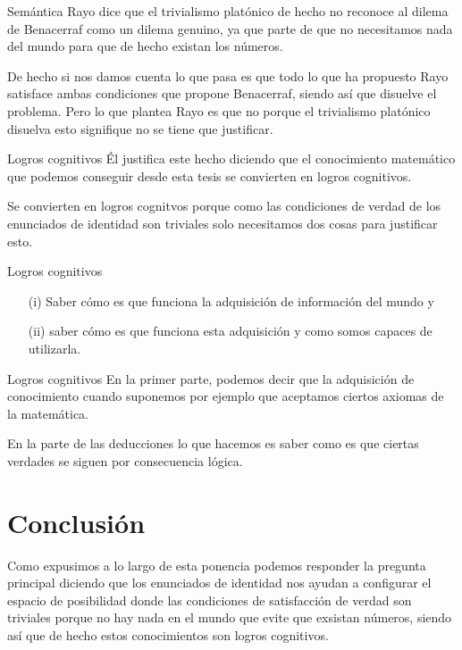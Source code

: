 \documentclass{beamer}
\begin{document}
      \begin{frame}{Semántica}
        Rayo dice que el trivialismo plat\'onico de hecho no 
        reconoce al dilema de Benacerraf como un dilema genuino, ya 
        que parte de que no necesitamos nada del mundo para que de hecho 
        existan los números. 
        
        De hecho si nos damos cuenta lo que pasa 
        es que todo lo que ha propuesto Rayo satisface ambas condiciones 
        que propone Benacerraf, siendo así que disuelve el problema. 
        Pero lo que plantea Rayo es que no porque el trivialismo 
        platónico disuelva esto signifique no se tiene que justificar.
      \end{frame}
    \begin{frame}{Logros cognitivos}
      Él justifica este hecho diciendo que el conocimiento matemático 
      que podemos conseguir desde esta tesis se convierten en logros 
      cognitivos.

      Se convierten en logros cognitvos porque como 
      las condiciones de verdad de los enunciados de identidad son 
      triviales solo necesitamos dos cosas para justificar esto.
      \begin{block}{Logros cognitivos}
        \begin{itemize}
          \item [(i)] Saber c\'omo es que funciona la adquisición de información 
          del mundo y
          \item [(ii)] saber c\'omo es que funciona esta adquisición 
          y como somos capaces de utilizarla.
        \end{itemize}
      \end{block}
    \end{frame}
    \begin{frame}{Logros cognitivos}
      En la primer parte, podemos decir que la adquisición de conocimiento
      cuando suponemos por ejemplo que aceptamos ciertos 
      axiomas de la matemática.

      En la parte de las deducciones lo que hacemos es saber 
      como es que ciertas verdades se siguen por consecuencia 
      lógica.
    \end{frame}
  \section{Conclusión}
    \begin{frame}
      Como expusimos a lo largo de esta ponencia podemos responder la 
      pregunta principal diciendo que los 
      enunciados de identidad nos ayudan a configurar el espacio 
      de posibilidad donde las condiciones de satisfacción
      de verdad son triviales porque no hay nada en el mundo 
      que evite que exsistan números, siendo así que de hecho 
      estos conocimientos son logros cognitivos. 
    \end{frame}
\end{document}
